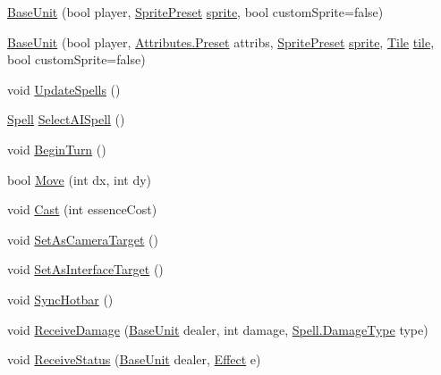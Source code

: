 \begin{DoxyCompactItemize}
\item 
\mbox{\hyperlink{class_base_unit_a039c2e87402c3edaa8637e3be14b34b8}{Base\+Unit}} (bool player, \mbox{\hyperlink{class_base_unit_a086712791ce1a3cb5dc6448d8bbc1f62}{Sprite\+Preset}} \mbox{\hyperlink{class_base_unit_aa23a25b8e47771e1237a00c602707090}{sprite}}, bool custom\+Sprite=false)
\item 
\mbox{\hyperlink{class_base_unit_a2c6cc9c0c1a13df230bb2a3b3622448b}{Base\+Unit}} (bool player, \mbox{\hyperlink{class_attributes_a2dcc4757e5dd7b7d518f43f4f194d175}{Attributes.\+Preset}} attribs, \mbox{\hyperlink{class_base_unit_a086712791ce1a3cb5dc6448d8bbc1f62}{Sprite\+Preset}} \mbox{\hyperlink{class_base_unit_aa23a25b8e47771e1237a00c602707090}{sprite}}, \mbox{\hyperlink{class_tile}{Tile}} \mbox{\hyperlink{class_base_unit_accbce29bc34e46e47cbcc82abc24597f}{tile}}, bool custom\+Sprite=false)
\item 
void \mbox{\hyperlink{class_base_unit_a8b9c4263f81ef40c1841d26ee0573bce}{Update\+Spells}} ()
\item 
\mbox{\hyperlink{class_spell}{Spell}} \mbox{\hyperlink{class_base_unit_a94ba01b61de9b22ba2431a47caf13cd5}{Select\+A\+I\+Spell}} ()
\item 
void \mbox{\hyperlink{class_base_unit_a0f8955c72dfa02027c1b247d74233f0d}{Begin\+Turn}} ()
\item 
bool \mbox{\hyperlink{class_base_unit_af7d5e0c6e087b3e5c8af203dfb11268b}{Move}} (int dx, int dy)
\item 
void \mbox{\hyperlink{class_base_unit_a5fb838313b1a61dbf38d440c2a12667e}{Cast}} (int essence\+Cost)
\item 
void \mbox{\hyperlink{class_base_unit_ac4b2eaeb4641fc124d36d413b6193c56}{Set\+As\+Camera\+Target}} ()
\item 
void \mbox{\hyperlink{class_base_unit_abae0a52156648495ea6e8487782f8636}{Set\+As\+Interface\+Target}} ()
\item 
void \mbox{\hyperlink{class_base_unit_a15ea3ea70ab13cf8aa582b848cd0531b}{Sync\+Hotbar}} ()
\item 
void \mbox{\hyperlink{class_base_unit_a8412f2b3e8ec9c3ff75b41b830fde443}{Receive\+Damage}} (\mbox{\hyperlink{class_base_unit}{Base\+Unit}} dealer, int damage, \mbox{\hyperlink{class_spell_a3e228beaf92e2c035e6599aaf0ac2d2a}{Spell.\+Damage\+Type}} type)
\item 
void \mbox{\hyperlink{class_base_unit_a0f900d0c70a2436dd81d8127f8d43336}{Receive\+Status}} (\mbox{\hyperlink{class_base_unit}{Base\+Unit}} dealer, \mbox{\hyperlink{class_effect}{Effect}} e)

\end{DoxyCompactItemize}
